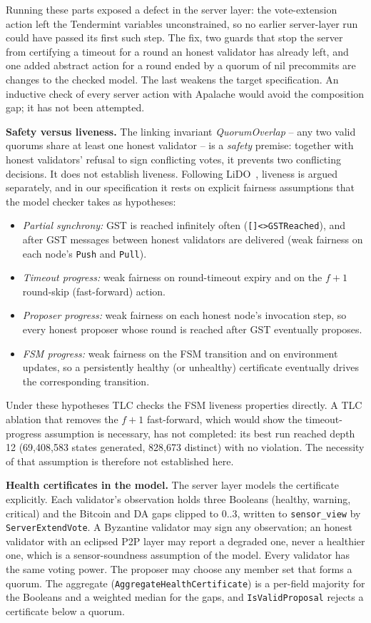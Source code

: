 Running these parts exposed a defect in the server layer: the vote-extension
action left the Tendermint variables unconstrained, so no earlier
server-layer run could have passed its first such step. The fix, two guards
that stop the server from certifying a timeout for a round an honest
validator has already left, and one added abstract action for a round ended
by a quorum of nil precommits are changes to the checked model. The last
weakens the target specification. An inductive check of every server action
with Apalache would avoid the composition gap; it has not been attempted.

\textbf{Safety versus liveness.} The linking invariant \emph{QuorumOverlap}
-- any two valid quorums share at least one honest validator -- is a
\emph{safety} premise: together with honest validators' refusal to sign
conflicting votes, it prevents two conflicting decisions. It does not
establish liveness. Following LiDO~\cite{qiu2024lido}, liveness is argued
separately, and in our specification it rests on explicit fairness
assumptions that the model checker takes as hypotheses:
\begin{itemize}
  \item \emph{Partial synchrony:} GST is reached infinitely often
  (\texttt{[]<>GSTReached}), and after GST messages between honest
  validators are delivered (weak fairness on each node's \texttt{Push} and
  \texttt{Pull}).
  \item \emph{Timeout progress:} weak fairness on round-timeout expiry and
  on the $f{+}1$ round-skip (fast-forward) action.
  \item \emph{Proposer progress:} weak fairness on each honest node's
  invocation step, so every honest proposer whose round is reached after
  GST eventually proposes.
  \item \emph{FSM progress:} weak fairness on the FSM transition and on
  environment updates, so a persistently healthy (or unhealthy)
  certificate eventually drives the corresponding transition.
\end{itemize}
Under these hypotheses TLC checks the FSM liveness properties directly. A
TLC ablation that removes the $f{+}1$ fast-forward, which would show the
timeout-progress assumption is necessary, has not completed: its best run
reached depth 12 (69{,}408{,}583 states generated, 828{,}673 distinct) with
no violation. The necessity of that assumption is therefore not established
here.

\textbf{Health certificates in the model.} The server layer models the
certificate explicitly. Each validator's observation holds three Booleans
(healthy, warning, critical) and the Bitcoin and DA gaps clipped to $0..3$,
written to \texttt{sensor\_view} by \texttt{ServerExtendVote}. A Byzantine
validator may sign any observation; an honest validator with an eclipsed P2P
layer may report a degraded one, never a healthier one, which is a
sensor-soundness assumption of the model. Every validator has the same voting
power. The proposer may choose any member set that forms a quorum. The
aggregate (\texttt{AggregateHealthCertificate}) is a per-field majority for
the Booleans and a weighted median for the gaps, and \texttt{IsValidProposal}
rejects a certificate below a quorum.

